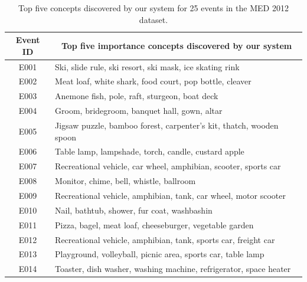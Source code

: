 \begin{table}
		\renewcommand{\arraystretch}{1.3}
		\centering
		\caption{Top five concepts discovered by our system for 25 events in the MED 2012 dataset.}
	\begin{tabular}{|c|l|}
		\toprule
		\textbf{Event ID} & \multicolumn{1}{c|}{\textbf{Top five importance concepts discovered by our system}} \\ \midrule
		E001              & Ski, slide rule, ski resort, ski mask, ice skating rink                             \\ \midrule
		E002              & Meat loaf, white shark, food court, pop bottle, cleaver                             \\ \midrule
		E003              & Anemone fish, pole, raft, sturgeon, boat deck                                       \\ \midrule
		E004              & Groom, bridegroom, banquet hall, gown, altar                                        \\ \midrule
		E005              & Jigsaw puzzle, bamboo forest, carpenter's kit, thatch, wooden spoon                 \\ \midrule
		E006              & Table lamp, lampshade, torch, candle, custard apple                                 \\ \midrule
		E007              & Recreational vehicle, car wheel, amphibian, scooter, sports car                     \\ \midrule
		E008              & Monitor, chime, bell, whistle, ballroom                                             \\ \midrule
		E009              & Recreational vehicle, amphibian, tank, car wheel, motor scooter                     \\ \midrule
		E010              & Nail, bathtub, shower, fur coat, washbashin                                         \\ \midrule
		E011              & Pizza, bagel, meat loaf, cheeseburger, vegetable garden                             \\ \midrule
		E012              & Recreational vehicle, amphibian, tank, sports car, freight car                      \\ \midrule
		E013              & Playground, volleyball, picnic area, sports car, table lamp                         \\ \midrule
		E014              & Toaster, dish washer, washing machine, refrigerator, space heater                   \\ \midrule

\end{tabular}
\end{table}
